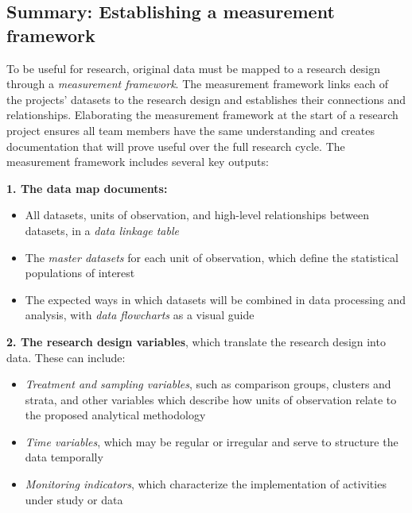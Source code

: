 \documentclass[
]{book}
\providecommand{\tightlist}{%
  \setlength{\itemsep}{0pt}\setlength{\parskip}{0pt}}
\begin{document}
\begin{summary}
\hypertarget{summary-establishing-a-measurement-framework}{%
\subsection*{Summary: Establishing a measurement framework}\label{summary-establishing-a-measurement-framework}}

To be useful for research, original data must be mapped to a research design through a \emph{measurement framework}. The measurement framework links each of the projects' datasets to the research design and establishes their connections and relationships. Elaborating the measurement framework at the start of a research project ensures all team members have the same understanding and creates documentation that will prove useful over the full research cycle. The measurement framework includes several key outputs:

\textbf{1. The data map documents:}

\begin{itemize}
\tightlist
\item
  All datasets, units of observation, and high-level relationships between datasets, in a \emph{data linkage table}
\item
  The \emph{master datasets} for each unit of observation, which define the statistical populations of interest
\item
  The expected ways in which datasets will be combined in data processing and analysis, with \emph{data flowcharts} as a visual guide
\end{itemize}

\textbf{2. The research design variables}, which translate the research design into data. These can include:

\begin{itemize}
\tightlist
\item
  \emph{Treatment and sampling variables}, such as comparison groups, clusters and strata, and other variables which describe how units of observation relate to the proposed analytical methodology
\item
  \emph{Time variables}, which may be regular or irregular and serve to structure the data temporally
\item
  \emph{Monitoring indicators}, which characterize the implementation of activities under study or data
\end{itemize}


\end{summary}
\end{document}
